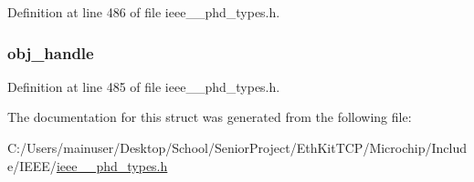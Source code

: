 Definition at line 486 of file ieee\+\_\+\_\+phd\+\_\+types.\+h.

\hypertarget{struct___observation_scan_abbfff52b7a4956021522f5750c4b32c6}{}
\subsubsection[{obj\+\_\+handle}]{ obj\+\_\+handle}\label{struct___observation_scan_abbfff52b7a4956021522f5750c4b32c6}


Definition at line 485 of file ieee\+\_\+\_\+phd\+\_\+types.\+h.



The documentation for this struct was generated from the following file\+:\begin{DoxyCompactItemize}
\item 
C\+:/\+Users/mainuser/\+Desktop/\+School/\+Senior\+Project/\+Eth\+Kit\+T\+C\+P/\+Microchip/\+Include/\+I\+E\+E\+E/\hyperlink{ieee__11073__phd__types_8h}{ieee\+\_\+\_\+phd\+\_\+types.\+h}\end{DoxyCompactItemize}
